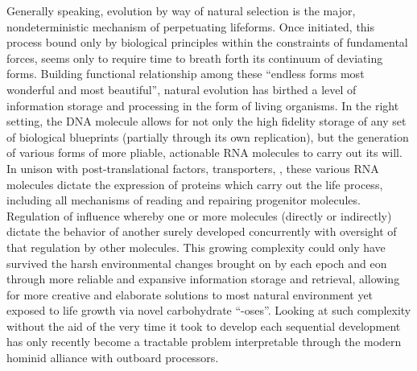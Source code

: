 Generally speaking, evolution by way of natural selection is the major, nondeterministic mechanism of perpetuating lifeforms. Once initiated, this process bound only by biological principles within the constraints of fundamental forces, seems only to require time to breath forth its continuum of deviating forms. Building functional relationship among these ``endless forms most wonderful and most beautiful''\citep{darwin1869origin}, natural evolution has birthed a level of information storage and processing in the form of living organisms. In the right setting, the DNA molecule allows for not only the high fidelity storage of any set of biological blueprints (partially through its own replication), but the generation of various forms of more pliable, actionable RNA molecules to carry out its will\citep{roeder1991complexities}. In unison with post-translational factors, transporters, \etc, these various RNA molecules dictate the expression of proteins which carry out the life process, including all mechanisms of reading and repairing progenitor molecules. Regulation of influence whereby one or more molecules (directly or indirectly) dictate the behavior of another surely developed concurrently with oversight of that regulation by other molecules. This growing complexity could only have survived the harsh environmental changes brought on by each epoch and eon through more reliable and expansive information storage and retrieval, allowing for more creative and elaborate solutions to most natural environment yet exposed to life \eg growth via novel carbohydrate ``-oses''. Looking at such complexity without the aid of the very time it took to develop each sequential development has only recently become a tractable problem interpretable through the modern hominid alliance with outboard processors.


